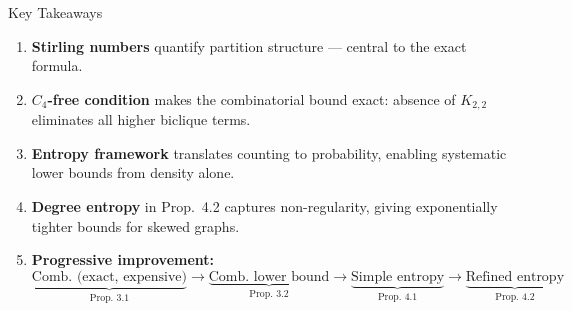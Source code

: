\documentclass[aspectratio=169]{beamer}
\begin{document}
\begin{frame}{Key Takeaways}
  \begin{enumerate}
    \item \textbf{Stirling numbers} quantify partition structure --- central to the exact formula.
    \item \textbf{$C_4$-free condition} makes the combinatorial bound exact: absence of $K_{2,2}$ eliminates all higher biclique terms.
    \item \textbf{Entropy framework} translates counting to probability, enabling systematic lower bounds from density alone.
    \item \textbf{Degree entropy} in Prop.\ 4.2 captures non-regularity, giving exponentially tighter bounds for skewed graphs.
    \item \textbf{Progressive improvement:}
      \[
        \underbrace{\text{Comb.\ (exact, expensive)}}_{\text{Prop.\ 3.1}}
        \to \underbrace{\text{Comb.\ lower bound}}_{\text{Prop.\ 3.2}}
        \to \underbrace{\text{Simple entropy}}_{\text{Prop.\ 4.1}}
        \to \underbrace{\text{Refined entropy}}_{\text{Prop.\ 4.2}}
      \]
  \end{enumerate}
\end{frame}
\end{document}
